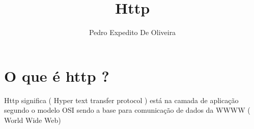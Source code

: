 \documentclass[12pt, a4paper]{article}
\author{Pedro Expedito De Oliveira}
\title{Http}
\begin{document}
\maketitle

\section{O que é http ?}
Http significa ( Hyper text transfer protocol ) está na camada
de aplicação segundo o modelo OSI sendo a base para comunicação
de dados da WWWW ( World Wide Web)
\end{document}
